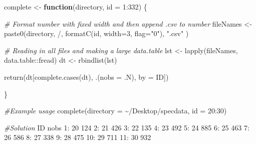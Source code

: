 \documentclass[
]{article}
\newenvironment{Shaded}{\begin{snugshade}}{\end{snugshade}}
\newcommand{\AttributeTok}[1]{\textcolor[rgb]{0.77,0.63,0.00}{#1}}
\newcommand{\CommentTok}[1]{\textcolor[rgb]{0.56,0.35,0.01}{\textit{#1}}}
\newcommand{\ControlFlowTok}[1]{\textcolor[rgb]{0.13,0.29,0.53}{\textbf{#1}}}
\newcommand{\DecValTok}[1]{\textcolor[rgb]{0.00,0.00,0.81}{#1}}
\newcommand{\FunctionTok}[1]{\textcolor[rgb]{0.00,0.00,0.00}{#1}}
\newcommand{\NormalTok}[1]{#1}
\newcommand{\OtherTok}[1]{\textcolor[rgb]{0.56,0.35,0.01}{#1}}
\newcommand{\SpecialCharTok}[1]{\textcolor[rgb]{0.00,0.00,0.00}{#1}}
\newcommand{\StringTok}[1]{\textcolor[rgb]{0.31,0.60,0.02}{#1}}
\begin{document}
\begin{Shaded}
\begin{Highlighting}[]
\NormalTok{complete }\OtherTok{\textless{}{-}} \ControlFlowTok{function}\NormalTok{(directory,  }\AttributeTok{id =} \DecValTok{1}\SpecialCharTok{:}\DecValTok{332}\NormalTok{) \{}
  
  \CommentTok{\# Format number with fixed width and then append .csv to number}
\NormalTok{  fileNames }\OtherTok{\textless{}{-}} \FunctionTok{paste0}\NormalTok{(directory, }\StringTok{\textquotesingle{}/\textquotesingle{}}\NormalTok{, }\FunctionTok{formatC}\NormalTok{(id, }\AttributeTok{width=}\DecValTok{3}\NormalTok{, }\AttributeTok{flag=}\StringTok{"0"}\NormalTok{), }\StringTok{".csv"}\NormalTok{ )}
  
  \CommentTok{\# Reading in all files and making a large data.table}
\NormalTok{  lst }\OtherTok{\textless{}{-}} \FunctionTok{lapply}\NormalTok{(fileNames, data.table}\SpecialCharTok{::}\NormalTok{fread)}
\NormalTok{  dt }\OtherTok{\textless{}{-}} \FunctionTok{rbindlist}\NormalTok{(lst)}
  
  \FunctionTok{return}\NormalTok{(dt[}\FunctionTok{complete.cases}\NormalTok{(dt), .(}\AttributeTok{nobs =}\NormalTok{ .N), }\AttributeTok{by =}\NormalTok{ ID])}
  
\NormalTok{\}}

\CommentTok{\#Example usage}
\FunctionTok{complete}\NormalTok{(}\AttributeTok{directory =} \StringTok{\textquotesingle{}\textasciitilde{}/Desktop/specdata\textquotesingle{}}\NormalTok{, }\AttributeTok{id =} \DecValTok{20}\SpecialCharTok{:}\DecValTok{30}\NormalTok{)}

\CommentTok{\#Solution}
\NormalTok{    ID nobs}
 \DecValTok{1}\SpecialCharTok{:} \DecValTok{20}  \DecValTok{124}
 \DecValTok{2}\SpecialCharTok{:} \DecValTok{21}  \DecValTok{426}
 \DecValTok{3}\SpecialCharTok{:} \DecValTok{22}  \DecValTok{135}
 \DecValTok{4}\SpecialCharTok{:} \DecValTok{23}  \DecValTok{492}
 \DecValTok{5}\SpecialCharTok{:} \DecValTok{24}  \DecValTok{885}
 \DecValTok{6}\SpecialCharTok{:} \DecValTok{25}  \DecValTok{463}
 \DecValTok{7}\SpecialCharTok{:} \DecValTok{26}  \DecValTok{586}
 \DecValTok{8}\SpecialCharTok{:} \DecValTok{27}  \DecValTok{338}
 \DecValTok{9}\SpecialCharTok{:} \DecValTok{28}  \DecValTok{475}
\DecValTok{10}\SpecialCharTok{:} \DecValTok{29}  \DecValTok{711}
\DecValTok{11}\SpecialCharTok{:} \DecValTok{30}  \DecValTok{932}
\end{Highlighting}
\end{Shaded}
\end{document}
